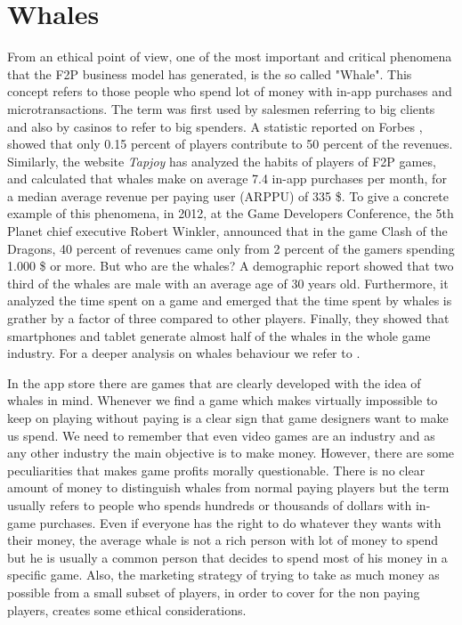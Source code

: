\section{Whales} 
From an ethical point of view, one of the most important and critical phenomena that the F2P business model has generated, is the so called "Whale". This concept refers to those people who spend lot of money with in-app purchases and microtransactions. The term was first used by salesmen referring to big clients and also by casinos to refer to big spenders. A statistic reported on Forbes \cite{tassi_why_????}, showed that only 0.15 percent of players contribute to 50 percent of the revenues. Similarly, the website \textit{Tapjoy} \cite{_infographic:_????} has analyzed the habits of players of F2P games, and calculated that whales make on average 7.4 in-app purchases per month, for a median average revenue per paying user (ARPPU) of 335 \$. To give a concrete example of this phenomena, in 2012, at the Game Developers Conference, the 5th Planet chief executive Robert Winkler, announced \cite{_what_2013} that in the game Clash of the Dragons, 40 percent of revenues came only from 2 percent of the gamers spending 1.000 \$ or more. But who are the whales? A demographic report \cite{good_who_????} showed that two third of the whales are male with an average age of 30 years old. Furthermore, it analyzed the time spent on a game and emerged that the time spent by whales is grather by a factor of three compared to other players. Finally, they showed that smartphones and tablet generate almost half of the whales in the whole game industry. For a deeper analysis on whales behaviour we refer to \cite{_how_2015}. 

In the app store there are games that are clearly developed with the idea of whales in mind. Whenever we find a game which makes virtually impossible to keep on playing without paying is a clear sign that game designers want to make us spend. We need to remember that even video games are an industry and as any other industry the main objective is to make money. However, there are some peculiarities that makes game profits morally questionable. There is no clear amount of money to distinguish whales from normal paying players but the term usually refers to people who spends hundreds or thousands of dollars with in-game purchases. Even if everyone has the right to do whatever they wants with their money, the average whale is not a rich person with lot of money to spend but he is usually a common person that decides to spend most of his money in a specific game. Also, the marketing strategy of trying to take as much money as possible from a small subset of players, in order to cover for the non paying players, creates some ethical considerations. 

